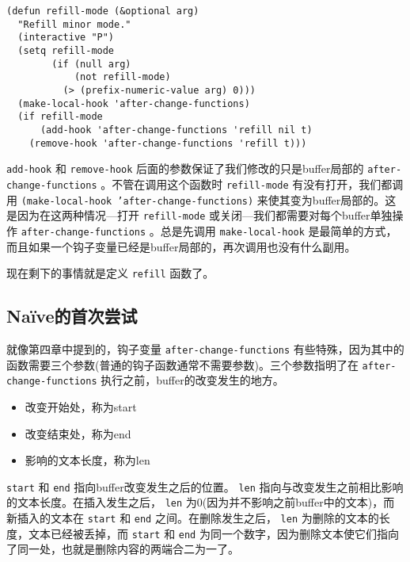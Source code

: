 \begin{verbatim}
(defun refill-mode (&optional arg)
  "Refill minor mode."
  (interactive "P")
  (setq refill-mode
        (if (null arg)
            (not refill-mode)
          (> (prefix-numeric-value arg) 0)))
  (make-local-hook 'after-change-functions)
  (if refill-mode
      (add-hook 'after-change-functions 'refill nil t)
    (remove-hook 'after-change-functions 'refill t)))
\end{verbatim}

 \texttt{add-hook} 和 \texttt{remove-hook} 后面的参数保证了我们修改的只是buffer局部的 \texttt{after-change-functions} 。不管在调用这个函数时 \texttt{refill-mode} 有没有打开，我们都调用 \texttt{(make-local-hook 'after-change-functions)} 来使其变为buffer局部的。这是因为在这两种情况---打开 \texttt{refill-mode} 或关闭---我们都需要对每个buffer单独操作 \texttt{after-change-functions} 。总是先调用 \texttt{make-local-hook} 是最简单的方式，而且如果一个钩子变量已经是buffer局部的，再次调用也没有什么副用。

现在剩下的事情就是定义 \texttt{refill} 函数了。

\subsection{Na\"{i}ve的首次尝试}
\label{section:07-Naive-First-Try}

就像第四章中提到的，钩子变量 \texttt{after-change-functions} 有些特殊，因为其中的函数需要三个参数(普通的钩子函数通常不需要参数)。三个参数指明了在 \texttt{after-change-functions} 执行之前，buffer的改变发生的地方。

\begin{itemize}
  \item 改变开始处，称为start
  \item 改变结束处，称为end
  \item 影响的文本长度，称为len
\end{itemize}

 \texttt{start} 和 \texttt{end} 指向buffer改变发生之后的位置。 \texttt{len} 指向与改变发生之前相比影响的文本长度。在插入发生之后， \texttt{len} 为0(因为并不影响之前buffer中的文本)，而新插入的文本在 \texttt{start} 和 \texttt{end} 之间。在删除发生之后， \texttt{len} 为删除的文本的长度，文本已经被丢掉，而 \texttt{start} 和 \texttt{end} 为同一个数字，因为删除文本使它们指向了同一处，也就是删除内容的两端合二为一了。

